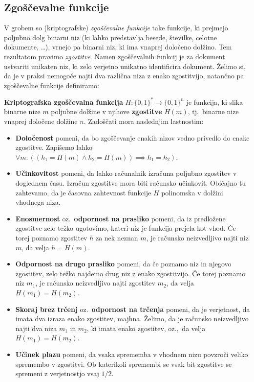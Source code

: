 \documentclass[isrm2, tisk]{fmfdelo}
\begin{document}
\subsection{Zgoščevalne funkcije}
V grobem so (kriptografske) \textit{zgoščevalne funkcije} take funkcije, ki prejmejo poljubno dolg binarni 
niz (ki lahko predstavlja besede, številke, celotne dokumente, \dots), vrnejo pa binarni niz, ki ima
vnaprej določeno dolžino. Tem rezultatom pravimo \textit{zgostitve}. Namen zgoščevalnih funkcij je 
za dokument ustvariti unikaten niz, ki zelo verjetno unikatno identificira dokument. Želimo si, da
je v praksi nemogoče najti dva različna niza z enako zgostitvijo, natančno pa zgoščevalne funkcije
definiramo:

\begin{definicija} 
\label{def:hash}
    \textbf{Kriptografska zgoščevalna funkcija} $H: \{0, 1\}^* \rightarrow \{0, 1\}^n$ je funkcija, 
    ki slika binarne nize $m$ poljubne dolžine v njihove \textbf{zgostitve} $H(m)$, tj.\ binarne nize 
    vnaprej določene dolžine $n$. Zadoščati mora naslednjim lastnostim:
    \begin{itemize}
        \item \textbf{Določenost} pomeni, da bo zgoščevanje enakih nizov vedno privedlo do enake 
            zgostitve. Zapišemo lahko $\forall m: ((h_1 = H(m) \wedge h_2 = H(m)) \implies h_1 = h_2)$.
        \item \textbf{Učinkovitost} pomeni, da lahko računalnik izračuna poljubno zgostitev v doglednem 
            času. Izračun zgostitve mora biti računsko učinkovit. Običajno tu zahtevamo, da je časovna
            zahtevnost funkcije $H$ polinomska v dolžini vhodnega niza.
        \item \textbf{Enosmernost} oz.\ \textbf{odpornost na prasliko} pomeni, da iz predložene 
            zgostitve zelo težko ugotovimo, kateri niz je funkcija prejela kot vhod. Če torej poznamo 
            zgostitev $h$ za nek neznan $m$, je računsko neizvedljivo najti niz $m$, da velja $h = H(m)$.
        \item \textbf{Odpornost na drugo prasliko} pomeni, da če poznamo niz in njegovo zgostitev, 
            zelo težko najdemo drug niz z enako zgostitvijo. Če torej poznamo niz $m_1$, je računsko 
            neizvedljivo najti zgostitev $m_2$, da velja $H(m_1) = H(m_2)$.
        \item \textbf{Skoraj brez trčenj} oz.\ \textbf{odpornost na trčenja} pomeni, da je verjetnost,
            da imata dva izraza enako zgostitev, majhna. Želimo, da je računsko neizvedljivo
            najti dva niza  $m_1$ in $m_2$, ki imata enako zgostitev, oz.,\ da velja $H(m_1) = H(m_2)$.
        \item \textbf{Učinek plazu} pomeni, da vsaka sprememba v vhodnem nizu povzroči veliko spremembo 
            v zgostitvi. Ob katerikoli spremembi se vsak bit zgostitve se spremeni z verjetnostjo 
            vsaj $1/2$.
    \end{itemize}
\end{definicija}
\end{document}
